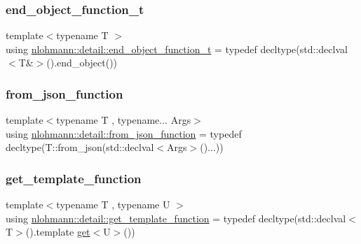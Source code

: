 \mbox{\label{namespacenlohmann_1_1detail_af52d6d2521c386998ae940d118182ebc}} 
\subsubsection{\texorpdfstring{end\+\_\+object\+\_\+function\+\_\+t}{end\_object\_function\_t}}
{\footnotesize\ttfamily template$<$typename T $>$ \\
using \hyperlink{namespacenlohmann_1_1detail_af52d6d2521c386998ae940d118182ebc}{nlohmann\+::detail\+::end\+\_\+object\+\_\+function\+\_\+t} = typedef decltype(std\+::declval$<$T\&$>$().end\+\_\+object())}

\mbox{\label{namespacenlohmann_1_1detail_a1711ee5cef66a0523055c8d9f024f322}} 
\subsubsection{\texorpdfstring{from\+\_\+json\+\_\+function}{from\_json\_function}}
{\footnotesize\ttfamily template$<$typename T , typename... Args$>$ \\
using \hyperlink{namespacenlohmann_1_1detail_a1711ee5cef66a0523055c8d9f024f322}{nlohmann\+::detail\+::from\+\_\+json\+\_\+function} = typedef decltype(T\+::from\+\_\+json(std\+::declval$<$Args$>$()...))}

\mbox{\label{namespacenlohmann_1_1detail_ab4d22cdb6521ee3508db496dea66711e}} 
\subsubsection{\texorpdfstring{get\+\_\+template\+\_\+function}{get\_template\_function}}
{\footnotesize\ttfamily template$<$typename T , typename U $>$ \\
using \hyperlink{namespacenlohmann_1_1detail_ab4d22cdb6521ee3508db496dea66711e}{nlohmann\+::detail\+::get\+\_\+template\+\_\+function} = typedef decltype(std\+::declval$<$T$>$().template \hyperlink{namespacenlohmann_1_1detail_acc422c11342b31368f610b6f96fcedc6}{get}$<$U$>$())}

